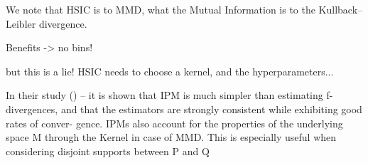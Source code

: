 We note that HSIC is to MMD, what the Mutual Information is to the Kullback–Leibler divergence.

Benefits -> no bins! 

but this is a lie! HSIC needs to choose a kernel, and the hyperparameters...  

In their study (\cite{sriperumbudur2009integral}) -- it is shown that IPM is much
simpler than estimating f-divergences, and that the estimators
are strongly consistent while exhibiting good rates of conver-
gence. IPMs also account for the properties of
the underlying space M through the Kernel in case of MMD. This is especially
useful when considering disjoint supports between P and Q


